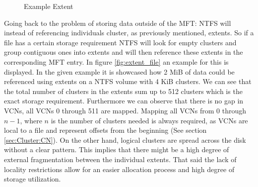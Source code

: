 \begin{figure}[h]
	\centering
	\caption{Example Extent\label{fig:extent_basic}}
\end{figure}
Going back to the problem of storing data outside of the MFT: NTFS will instead of referencing individuals cluster, as previously mentioned, extents. So if a file has a certain storage requirement NTFS will look for empty clusters and group contiguous ones into extents and will then reference these extents in the corresponding MFT entry. In figure \ref{fig:extent_file} an example for this is displayed. In the given example it is showcased how 2 MiB of data could be referenced using extents on a NTFS volume with 4 KiB clusters.
We can see that the total number of clusters in the extents sum up to 512 clusters which is the exact storage requirement. Furthermore we can observe that there is no gap in VCNs, all VCNs 0 through 511 are mapped. Mapping all VCNs from 0 through $n-1$, where $n$ is the number of clusters needed is always required, as VCNs are local to a file and represent offsets from the beginning (See section \ref{sec:Cluster:CN}). On the other hand, logical clusters are spread across the disk without a clear pattern.\cite{RUSSINOVICH_ET_AL:2012:WI} This implies that there might be a high degree of external fragmentation between the individual extents. That said the lack of locality restrictions allow for an easier allocation process and high degree of storage utilization.
